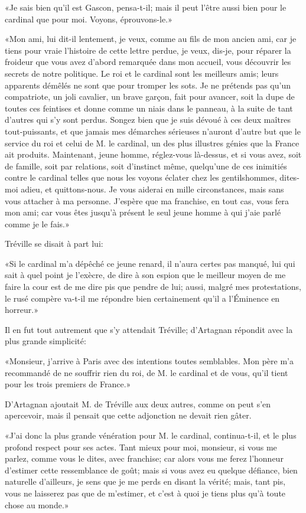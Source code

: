 «Je sais bien qu'il est Gascon, pensa-t-il; mais il peut l'être aussi bien pour le cardinal que pour moi. Voyons, éprouvons-le.» 

«Mon ami, lui dit-il lentement, je veux, comme au fils de mon ancien ami, car je tiens pour vraie l'histoire de cette lettre perdue, je veux, dis-je, pour réparer la froideur que vous avez d'abord remarquée dans mon accueil, vous découvrir les secrets de notre politique. Le roi et le cardinal sont les meilleurs amis; leurs apparents démêlés ne sont que pour tromper les sots. Je ne prétends pas qu'un compatriote, un joli cavalier, un brave garçon, fait pour avancer, soit la dupe de toutes ces feintises et donne comme un niais dans le panneau, à la suite de tant d'autres qui s'y sont perdus. Songez bien que je suis dévoué à ces deux maîtres tout-puissants, et que jamais mes démarches sérieuses n'auront d'autre but que le service du roi et celui de M. le cardinal, un des plus illustres génies que la France ait produits. Maintenant, jeune homme, réglez-vous là-dessus, et si vous avez, soit de famille, soit par relations, soit d'instinct même, quelqu'une de ces inimitiés contre le cardinal telles que nous les voyons éclater chez les gentilshommes, dites-moi adieu, et quittons-nous. Je vous aiderai en mille circonstances, mais sans vous attacher à ma personne. J'espère que ma franchise, en tout cas, vous fera mon ami; car vous êtes jusqu'à présent le seul jeune homme à qui j'aie parlé comme je le fais.» 

Tréville se disait à part lui: 

«Si le cardinal m'a dépêché ce jeune renard, il n'aura certes pas manqué, lui qui sait à quel point je l'exècre, de dire à son espion que le meilleur moyen de me faire la cour est de me dire pis que pendre de lui; aussi, malgré mes protestations, le rusé compère va-t-il me répondre bien certainement qu'il a l'Éminence en horreur.» 

Il en fut tout autrement que s'y attendait Tréville; d'Artagnan répondit avec la plus grande simplicité: 

«Monsieur, j'arrive à Paris avec des intentions toutes semblables. Mon père m'a recommandé de ne souffrir rien du roi, de M. le cardinal et de vous, qu'il tient pour les trois premiers de France.» 

D'Artagnan ajoutait M. de Tréville aux deux autres, comme on peut s'en apercevoir, mais il pensait que cette adjonction ne devait rien gâter. 

«J'ai donc la plus grande vénération pour M. le cardinal, continua-t-il, et le plus profond respect pour ses actes. Tant mieux pour moi, monsieur, si vous me parlez, comme vous le dites, avec franchise; car alors vous me ferez l'honneur d'estimer cette ressemblance de goût; mais si vous avez eu quelque défiance, bien naturelle d'ailleurs, je sens que je me perds en disant la vérité; mais, tant pis, vous ne laisserez pas que de m'estimer, et c'est à quoi je tiens plus qu'à toute chose au monde.» 

